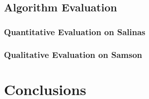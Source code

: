 \documentclass[10pt]{article}
\begin{document}
\clearpage
\subsection{Algorithm Evaluation}

\subsubsection{Quantitative Evaluation on Salinas}

\subsubsection{Qualitative Evaluation on Samson}



\clearpage
% 
% 
% 
% 
% 

\clearpage
% 
% 
% 
% 
% 
\section{Conclusions}



\printbibliography
\end{document}
